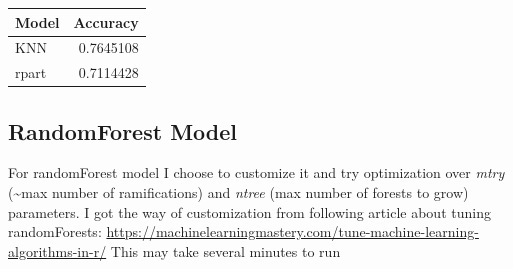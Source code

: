 \documentclass[]{article}
\begin{document}
\begin{longtable}[]{@{}lr@{}}
\toprule
Model & Accuracy\tabularnewline
\midrule
\endhead
KNN & 0.7645108\tabularnewline
rpart & 0.7114428\tabularnewline
\bottomrule
\end{longtable}

\hypertarget{randomforest-model}{%
\subsection{RandomForest Model}\label{randomforest-model}}

For randomForest model I choose to customize it and try optimization
over \emph{mtry} (\textasciitilde max number of ramifications) and
\emph{ntree} (max number of forests to grow) parameters. I got the way
of customization from following article about tuning randomForests:
\url{https://machinelearningmastery.com/tune-machine-learning-algorithms-in-r/}
This may take several minutes to run
\end{document}
